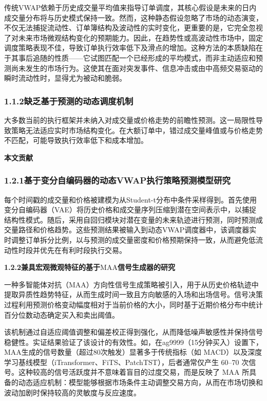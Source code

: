 \documentclass[UTF8]{ctexart}
\begin{document}
传统VWAP依赖于历史成交量平均值来指导订单调度，其核心假设是未来的日内成交量分布将与历史模式保持一致。然而，这种静态假设忽略了市场的动态演变，不仅无法捕捉流动性、订单簿结构及波动性的实时变化，更重要的是，它完全忽视了对未来市场微观结构变化的预期能力。因此，在趋势性或高波动性市场中，固定调度策略表现不佳，导致订单执行效率低下及滑点的增加。这种方法的本质缺陷在于其事后追随的性质------它试图匹配一个已经形成的平均模式，而非主动适应和预测尚未发生的市场行为。这使其在面对突发事件、信息冲击或由中高频交易驱动的瞬时流动性时，显得尤为被动和脆弱。

\subsubsection{\texorpdfstring{\textbf{1.1.2缺乏基于预测的动态调度机制}}{1.1.2缺乏基于预测的动态调度机制}}\label{ux7f3aux4e4fux57faux4e8eux9884ux6d4bux7684ux52a8ux6001ux8c03ux5ea6ux673aux5236}

大多数当前的执行框架并未纳入对成交量或价格走势的前瞻性预测。这一局限性导致策略无法适应实时市场结构变化。在大额订单中，错过成交量峰值或与价格走势不匹配，可能导致执行效率低下和成本增加。

\textbf{本文贡献}

\subsubsection{\texorpdfstring{\textbf{1.2.1基于变分自编码器的动态}VWAP\textbf{执行策略预测模型研究}}{1.2.1基于变分自编码器的动态VWAP执行策略预测模型研究}}\label{ux57faux4e8eux53d8ux5206ux81eaux7f16ux7801ux5668ux7684ux52a8ux6001vwapux6267ux884cux7b56ux7565ux9884ux6d4bux6a21ux578bux7814ux7a76}

每个时间戳的成交量和价格被建模为从Student-t分布中条件采样得到。首先使用变分自编码器（VAE）将历史价格和成交量序列压缩到潜在空间表示中，以捕捉结构性模式。随后，采用自回归模块对潜在变量的未来轨迹进行预测，同时预测成交量路径和价格趋势。这些预测结果被输入到动态VWAP调度器中，该调度器实时调整订单拆分比例，以与预测的成交量密度和价格预期保持一致，从而避免低流动性时段并优先在有利时段执行交易。

\textbf{1.2.2兼具宏观微观特征的基于}MAA\textbf{信号生成器的研究}

一种多智能体对抗（MAA）方向性信号生成策略被引入，用于从历史价格轨迹中提取异质性趋势特征，从而生成时间一致且方向敏感的入场和出场信号。信号决策过程利用预测价格变动幅度相对于当前价格的大小，同时基于近期价格分布中统计百分位数动态确定买入和卖出阈值。

该机制通过自适应阈值调整和偏差校正得到强化，从而降低噪声敏感性并保持信号稳健性。实证结果验证了该设计的有效性。如，在ag9999（15分钟买入）设置下，MAA生成的信号数量（超过80次触发）显著多于传统指标（如
MACD）以及深度学习基线模型（iTransformer、FiTS、PatchTST），后者通常仅产生
60--70 次信号。这种较高的信号活跃度并不意味着盲目的过度交易，而是反映了
MAA
所具备的动态适应机制：模型能够根据市场条件主动调整交易方向，从而在市场切换和波动加剧时保持较高的灵敏度与反应速度。
\end{document}
